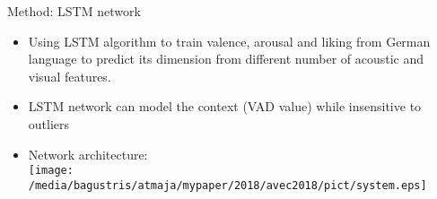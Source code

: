 \documentclass{beamer}
\begin{document}

\begin{frame}[t, fragile]{Method: LSTM network}
\begin{itemize}
\item Using LSTM algorithm to train valence, arousal and liking 
      from German language to predict its dimension from different 
      number of acoustic and visual features.
\item LSTM network can model the context (VAD value) while
      insensitive to outliers\footnotemark
\item Network architecture:\\
\texttt{[image: /media/bagustris/atmaja/mypaper/2018/avec2018/pict/system.eps]}
\end{itemize}
\end{frame}
\end{document}
